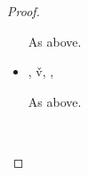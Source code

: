 \begin{lemma}
\begin{proof}
\begin{case}[T-DefMethod]
\begin{itemize}
\begin{subcase}[BE-DefMethod2]
                As above.
      \end{subcase}
    \item[]
      \begin{subcase}[BE-DefMethod3]
        \opsem {\openv{}}
         {}
         { {\disptable{}}},
  \opsem {\openv{}}
         {}
         {\v{v}},
  \opsem {\openv{}}
         {}
         {\errorval{\v{}}},
        \opsem {\openv{}}
                  {\e{}}
                {\errorval{\v{}}}

                As above.

      \end{subcase}
  \end{itemize}
\end{case}

\begin{case}[T-App]
  \ 


\end{case}
\end{proof}
\end{lemma}
